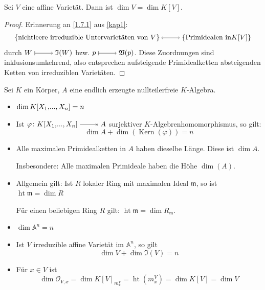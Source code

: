 \documentclass[a4paper,12pt]{scrbook}
\theoremstyle{keinenummern} %
\theoremstyle{mitnummern}
\theoremstyle{unserbeweis}
\newtheorem{proof}{Beweis}
\def\A{\mathbb{A}}
\def\V{\mathfrak{V}}
\def\I{\mathfrak{I}}
\def\O{\mathcal{O}}
\def\m{\mathfrak{m}}
\newcommand{\Kern}{\operatorname{Kern}}
\newcommand{\hoehe}{\operatorname{ht}}
\renewcommand{\phi}{\varphi}
\renewcommand{\dotsc}{\ensuremath{\!...}}
\renewcommand{\mapsto}{\raisebox{-1pt}{\tikz{\draw[thin,shorten >=3pt, |->] (0,0) node{\hspace*{0pt}} -- node{} (1,0);}}\penalty1000\relax}
\newcommand{\surj}{\raisebox{-1pt}{\tikz{\draw[thin,shorten >=3pt, ->>] (0,0) node{\hspace*{0pt}} -- node{} (1,0);}}\penalty1000\relax}
\newcommand{\lra}{\raisebox{-1pt}{\tikz{\draw[thin,shorten >=3pt, <->] (0,0) node{\hspace*{-2pt}} -- node{} (1,0);}}\penalty1000\relax}
\newcommand{\polyx}[1][n]{\ensuremath%
  [X_{1},\dotsc,X_{#1}]}
\begin{document}
\begin{prop}\label{3.2.4}
Sei $V$ eine affine Varietät. Dann ist $\dim V=\dim K[V]$. 
\end{prop}
\begin{proof}
Erinnerung an \cref{1.7.1} aus \cref{kap1}:
\[\displaystyle \{\text{nichtleere irreduzible Untervarietäten von }V\} \lra \{\text{Primidealen in}K[V]\}\]
durch $W\mapsto \I(W)$ bzw. $p \mapsto \V(p)$. Diese Zuordnungen sind inklusionsumkehrend, also entsprechen aufsteigende Primidealketten absteigenden Ketten von irreduziblen Varietäten.
\end{proof}

\begin{erinnerung}\label{3.2.5}
Sei $K$ ein Körper, $A$ eine endlich erzeugte nullteilerfreie $K$-Algebra. \begin{itemize}[leftmargin=*,labelindent=\parindent]
  \item $\dim K\polyx=n$
  \item Ist $\phi \colon K\polyx \surj A$ surjektiver $K$-Algebrenhomomorphismus, so gilt: \[\dim A+\dim(\Kern(\phi))=n\]
  \item Alle maximalen Primidealketten in $A$ haben dieselbe Länge. Diese ist $\dim A$. 

Insbesondere: Alle maximalen Primideale haben die Höhe $\dim(A)$.
  \item Allgemein gilt: Ist $R$ lokaler Ring mit maximalen Ideal $\m$, so ist $\hoehe\m=\dim R$

Für einen beliebigen Ring $R$ gilt: $\hoehe\m=\dim R_\m$.
\end{itemize}
\end{erinnerung}

\begin{kor}\label{3.2.6}
\begin{itemize}[leftmargin=*,labelindent=\parindent]
  \item $\dim \A^n=n$
  \item Ist $V$ irreduzible affine Varietät im $\A^n$, so gilt 
\[\dim V+\dim \I(V)=n\]
  \item Für $x \in V$ ist
\[\dim \O_{V,x}=\dim K[V]_{m_x^V}=\hoehe(m_x^V)=\dim K[V]=\dim V\]
\end{itemize}
\end{kor}
\end{document}
